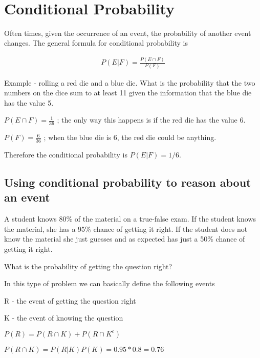 \documentclass[12pt]{article}
\begin{document}
\begin{center}
\\
\vspace{1cm}
\end{center}

\vspace{0.5cm}\noindent


\section*{Conditional Probability}
Often times, given the occurrence of an event, the probability of another event changes. The general formula for conditional probability is

\begin{align*}
P(E|F) = \frac{P(E \cap F)}{P(F)}
\end{align*}

Example - rolling a red die and a blue die. What is the probability that the two numbers on the dice sum to at least 11 given the information that the blue die has the value 5.

$P(E \cap F) = \frac{1}{36}$ ; the only way this happens is if the red die has the value 6.

$P(F) = \frac{6}{36}$ ; when the blue die is 6, the red die could be anything.

Therefore the conditional probability is $P(E|F) = 1/6$.

\subsection*{Using conditional probability to reason about an event}

A student knows 80\% of the material on a true-false exam. If the student knows the material, she has a 95\% chance of getting it right. If the student does not know the material she just guesses and as expected has just a 50\% chance of getting it right.

What is the probability of getting the question right?

In this type of problem we can basically define the following events

R - the event of getting the question right

K - the event of knowing the question

$P(R) = P(R \cap K) + P(R \cap K^c)$

$P(R \cap K) = P(R|K)P(K) = 0.95 * 0.8 = 0.76$
\end{document}
